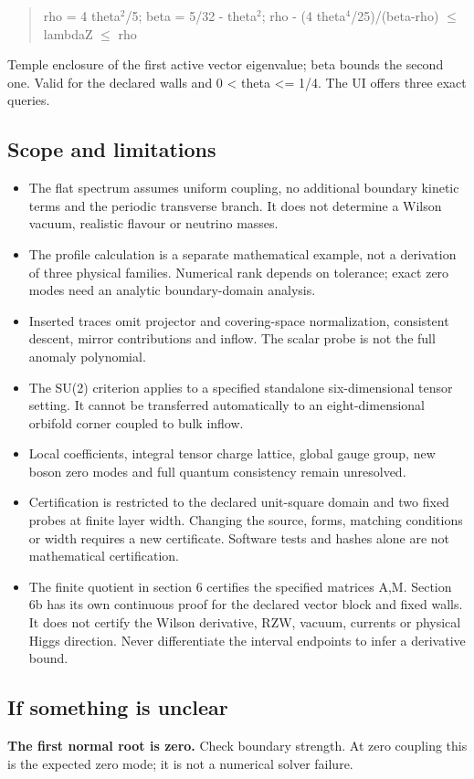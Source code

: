 \documentclass[11pt,a4paper]{article}
\begin{document}
\begin{quote}rho = 4 theta\ensuremath{{}^{2}}/5; beta = 5/32 - theta\ensuremath{{}^{2}}; rho - (4 theta\ensuremath{{}^{4}}/25)/(beta-rho) \ensuremath{\leq} lambdaZ \ensuremath{\leq} rho\end{quote}
Temple enclosure of the first active vector eigenvalue; beta bounds the second one. Valid for the declared walls and 0 < theta <= 1/4. The UI offers three exact queries.

\subsection*{Scope and limitations}
\begin{itemize}
\item The flat spectrum assumes uniform coupling, no additional boundary kinetic terms and the periodic transverse branch. It does not determine a Wilson vacuum, realistic flavour or neutrino masses.
\item The profile calculation is a separate mathematical example, not a derivation of three physical families. Numerical rank depends on tolerance; exact zero modes need an analytic boundary-domain analysis.
\item Inserted traces omit projector and covering-space normalization, consistent descent, mirror contributions and inflow. The scalar probe is not the full anomaly polynomial.
\item The SU(2) criterion applies to a specified standalone six-dimensional tensor setting. It cannot be transferred automatically to an eight-dimensional orbifold corner coupled to bulk inflow.
\item Local coefficients, integral tensor charge lattice, global gauge group, new boson zero modes and full quantum consistency remain unresolved.
\item Certification is restricted to the declared unit-square domain and two fixed probes at finite layer width. Changing the source, forms, matching conditions or width requires a new certificate. Software tests and hashes alone are not mathematical certification.
\item The finite quotient in section 6 certifies the specified matrices A,M. Section 6b has its own continuous proof for the declared vector block and fixed walls. It does not certify the Wilson derivative, RZW, vacuum, currents or physical Higgs direction. Never differentiate the interval endpoints to infer a derivative bound.
\end{itemize}
\subsection*{If something is unclear}
\textbf{The first normal root is zero.} Check boundary strength. At zero coupling this is the expected zero mode; it is not a numerical solver failure.
\end{document}

